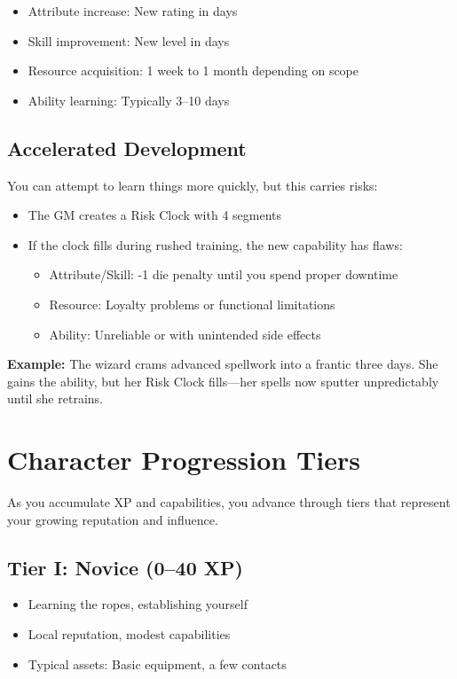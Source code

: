 \documentclass[11pt,twoside,openany]{book}
\begin{document}
\begin{itemize}
\item Attribute increase: New rating in days
\item Skill improvement: New level in days
\item Resource acquisition: 1 week to 1 month depending on scope
\item Ability learning: Typically 3–10 days
\end{itemize}

\subsection*{Accelerated Development}

You can attempt to learn things more quickly, but this carries risks:
\begin{itemize}
\item The GM creates a Risk Clock with 4 segments
\item If the clock fills during rushed training, the new capability has flaws:
\begin{itemize}
\item Attribute/Skill: -1 die penalty until you spend proper downtime
\item Resource: Loyalty problems or functional limitations
\item Ability: Unreliable or with unintended side effects
\end{itemize}
\end{itemize}

\textbf{Example:} The wizard crams advanced spellwork into a frantic three days. She gains the ability, but her Risk Clock fills—her spells now sputter unpredictably until she retrains.

\section*{Character Progression Tiers} 

As you accumulate XP and capabilities, you advance through tiers that represent your growing reputation and influence.

\subsection*{Tier I: Novice (0–40 XP)}

\begin{itemize}
\item Learning the ropes, establishing yourself
\item Local reputation, modest capabilities
\item Typical assets: Basic equipment, a few contacts
\end{itemize}
\end{document}
